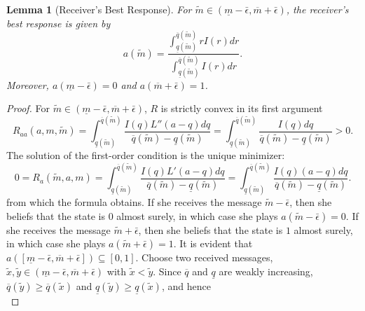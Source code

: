 \documentclass[12pt]{article}
\newtheorem{lemma}{Lemma}
\begin{document}
\begin{lemma}[Receiver's Best Response]\label{lemma:receiver}
For $\tilde{m}\in(\underline{m}-\bar{\epsilon},\overline{m}+\bar{\epsilon})$, the receiver's best response is given by
\begin{equation}
a(\tilde{m})=\frac{\int_{\underline{q}(\tilde{m})}^{\overline{q}(\tilde{m})}{rI(r)dr}}{\int_{\underline{q}(\tilde{m})}^{\overline{q}(\tilde{m})}{I(r)dr}}.
\end{equation}
Moreover, $a(\underline{m}-\bar{\epsilon})=0$ and $a(\overline{m}+\bar{\epsilon})=1$. 
\end{lemma}
\begin{proof}
For $\tilde{m}\in(\underline{m}-\bar{\epsilon},\overline{m}+\bar{\epsilon})$, $R$ is strictly convex in its first argument
\begin{equation}
R_{aa}(a,m,\tilde{m})=\int_{\underline{q}(\tilde{m})}^{\overline{q}(\tilde{m})}{\frac{I(q)L''(a-q)dq}{\overline{q}(\tilde{m})-\underline{q}(\tilde{m})}}=\int_{\underline{q}(\tilde{m})}^{\overline{q}(\tilde{m})}{\frac{I(q)dq}{\overline{q}(\tilde{m})-\underline{q}(\tilde{m})}}>0.
\end{equation}
The solution of the first-order condition is the unique minimizer:
\begin{equation}
0=R_{a}(\tilde{m},a,m)=\int_{\underline{q}(\tilde{m})}^{\overline{q}(\tilde{m})}{\frac{I(q)L'(a-q)dq}{\overline{q}(\tilde{m})-\underline{q}(\tilde{m})}}=\int_{\underline{q}(\tilde{m})}^{\overline{q}(\tilde{m})}{\frac{I(q)(a-q)dq}{\overline{q}(\tilde{m})-\underline{q}(\tilde{m})}}.
\end{equation}
from which the formula obtains. If she receives the message $\tilde{m}-\bar{\epsilon}$, then she beliefs that the state is $0$ almost surely, in which case she plays $a(\tilde{m}-\bar{\epsilon})=0$. If she receives the message $\tilde{m}+\bar{\epsilon}$, then she beliefs that the state is $1$ almost surely, in which case she plays $a(\tilde{m}+\bar{\epsilon})=1$. It is evident that $a([\underline{m}-\bar{\epsilon},\overline{m}+\bar{\epsilon}])\subseteq[0,1]$. Choose two received messages, $\tilde{x},\tilde{y}\in(\underline{m}-\bar{\epsilon},\overline{m}+\bar{\epsilon})$ with $\tilde{x}<\tilde{y}$. Since $\overline{q}$ and $\underline{q}$ are weakly increasing, $\overline{q}(\tilde{y})\geq\overline{q}(\tilde{x})$ and $\underline{q}(\tilde{y})\geq\underline{q}(\tilde{x})$, and hence
\begin{equation}

\end{equation}
\end{proof}
\end{document}
